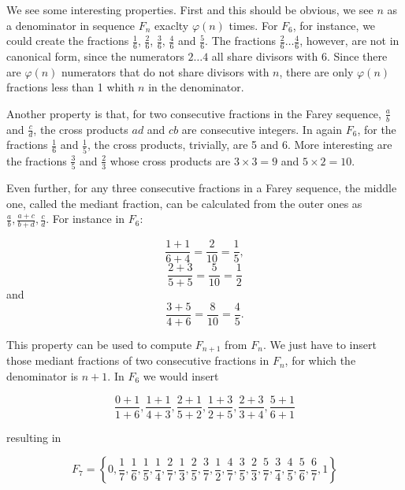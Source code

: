 \documentclass[tikz]{scrreprt}
\begin{document}
We see some interesting properties.
First and this should be obvious,
we see $n$ as a denominator in sequence $F_n$ exaclty
$\varphi(n)$ times.
For $F_6$, for instance, we could create the fractions
$\frac{1}{6}$, 
$\frac{2}{6}$, 
$\frac{3}{6}$, 
$\frac{4}{6}$ and
$\frac{5}{6}$.
The fractions $\frac{2}{6}\dots\frac{4}{6}$, however,
are not in canonical form, since the numerators $2\dots 4$ 
all share divisors with 6. 
Since there are $\varphi(n)$ numerators
that do not share divisors with $n$,
there are only $\varphi(n)$ fractions less than 1
whith $n$ in the denominator. 

Another property is that, for two consecutive fractions
in the Farey sequence,
$\frac{a}{b}$ and $\frac{c}{d}$,
the cross products
$ad$ and $cb$ are consecutive integers.
In again $F_6$, 
for the fractions $\frac{1}{6}$ and $\frac{1}{5}$,
the cross products, trivially, are 5 and 6.
More interesting are 
the fractions $\frac{3}{5}$ and $\frac{2}{3}$ whose
cross products are $3\times 3 = 9$ and $5 \times 2 = 10$.

Even further, for any three consecutive fractions
in a Farey sequence, the middle one, called the mediant fraction,
can be calculated from the outer ones as
$\frac{a}{b}, \frac{a+c}{b+d}, \frac{c}{d}$.
For instance in $F_6$: 

\begin{equation}
 \frac{1+1}{6+4} = \frac{2}{10} = \frac{1}{5},
\end{equation}
\begin{equation}
 \frac{2+3}{5+5} = \frac{5}{10} = \frac{1}{2}
\end{equation}
and
\begin{equation}
 \frac{3+5}{4+6} = \frac{8}{10} = \frac{4}{5}.
\end{equation}

This property can be used to compute $F_{n+1}$ from $F_n$.
We just have to insert those mediant fractions 
of two consecutive fractions in $F_n$, for which
the denominator is $n+1$.
In $F_6$ we would insert

\[
\frac{0+1}{1+6},
\frac{1+1}{4+3},
\frac{2+1}{5+2},
\frac{1+3}{2+5},
\frac{2+3}{3+4},
\frac{5+1}{6+1}
\]

resulting in

\begin{equation}
F_7 = \left\lbrace 0, 
\frac{1}{7}, 
\frac{1}{6}, 
\frac{1}{5}, 
\frac{1}{4}, 
\frac{2}{7}, 
\frac{1}{3}, 
\frac{2}{5}, 
\frac{3}{7}, 
\frac{1}{2}, 
\frac{4}{7}, 
\frac{3}{5}, 
\frac{2}{3}, 
\frac{5}{7}, 
\frac{3}{4}, 
\frac{4}{5}, 
\frac{5}{6}, 
\frac{6}{7}, 
1\right\rbrace
\end{equation}
\end{document}
